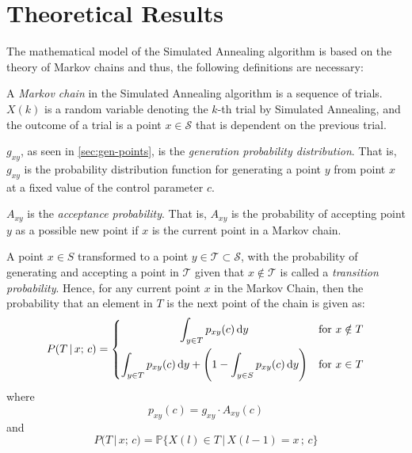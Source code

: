 \section{Theoretical Results}
\label{sec: methodology}
The mathematical model of the Simulated Annealing algorithm is based on the theory of Markov chains and thus, the following definitions are necessary: \vspace{5pt}

\begin{definition}
A \textit{Markov chain} in the Simulated Annealing algorithm is a sequence of trials. $X(k)$ is a random variable denoting the $k$-th trial by Simulated Annealing, and the outcome of a trial is a point $x \in \mathcal{S}$ that is dependent on the previous trial.
\end{definition}

\begin{definition}
$g_{xy}$, as seen in \cref{sec:gen-points}, is the \textit{generation probability distribution}. That is, $g_{xy}$ is the probability distribution function for generating a point $y$ from point $x$ at a fixed value of the control parameter $c$.
\end{definition}

\begin{definition}
$A_{xy}$ is the \textit{acceptance probability}. That is, $A_{xy}$ is the probability of accepting point $y$ as a possible new point if $x$ is the current point in a Markov chain.
\end{definition}

\begin{definition}
A point $x \in S$ transformed to a point $y \in \mathcal{T} \subset \mathcal{S}$,  with the probability of generating and accepting a point in $\mathcal{T}$ given that $x \notin \mathcal{T}$ is called a \textit{transition probability}. Hence, for any current point $x$ in the Markov Chain, then the probability that an element in $T$ is the next point of the chain is given as:
\begin{equation}
    P(T \, | \, x; \, c) = \begin{dcases}
        \hfil \int_{y \in T} p_{xy}(c) \, \dd y & \text{for } x \notin T \\
        \int_{y \in T} p_{xy}(c) \, \dd y + \Bigg( 1 - \int_{y \in S} p_{xy}(c) \, \dd y \Bigg) & \text{for } x \in T \\
    \end{dcases}
\end{equation}
where
\begin{equation}
    p_{xy}(c) = g_{xy} \cdot A_{xy}(c)
\end{equation}
and
\begin{equation}
    P(T \, | \, x; \, c) = \mathbb{P}\{ X(l) \in T \, | \, X(l-1) = x\, ;\, c \}
\end{equation}
\end{definition}

